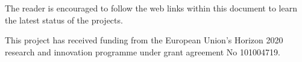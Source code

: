 \documentclass[11pt,twoside]{article}
\begin{document}
       The reader is encouraged to follow the web links within this document to learn the latest status of the projects.



\acknowledgements This project has received funding from the European Union's Horizon 2020 research and innovation programme under grant agreement No 101004719.




\end{document}
